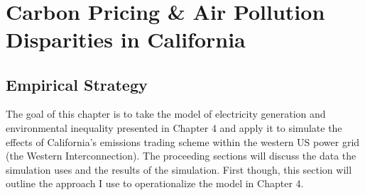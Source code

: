 ~
\newpage
\section{Carbon Pricing \& Air Pollution Disparities in California}

\subsection{Empirical Strategy}

The goal of this chapter is to take the model of electricity generation and environmental inequality presented in Chapter 4 and apply it to simulate the effects of California's emissions trading scheme within the western US power grid (the Western Interconnection). The proceeding sections will discuss the data the simulation uses and the results of the simulation. First though, this section will outline the approach I use to operationalize the model in Chapter 4. 

